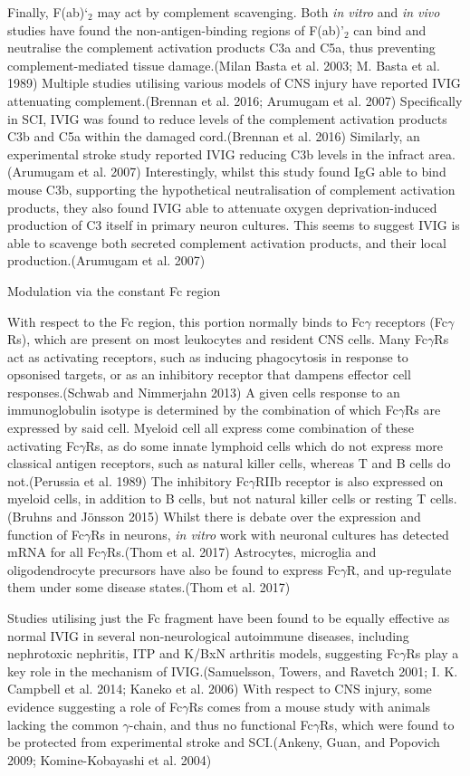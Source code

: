 \documentclass[9pt,lineno]{elife}
\begin{document}
\begin{landscape}
\begin{landscape}
Finally, F(ab)`\(_2\) may act by complement scavenging.
Both \emph{in vitro} and \emph{in vivo} studies have found the non-antigen-binding regions of F(ab)'\(_2\) can bind and neutralise the complement activation products C3a and C5a, thus preventing complement-mediated tissue damage.(Milan Basta et al. 2003; M. Basta et al. 1989) Multiple studies utilising various models of CNS injury have reported IVIG attenuating complement.(Brennan et al. 2016; Arumugam et al. 2007) Specifically in SCI, IVIG was found to reduce levels of the complement activation products C3b and C5a within the damaged cord.(Brennan et al. 2016) Similarly, an experimental stroke study reported IVIG reducing C3b levels in the infract area.(Arumugam et al. 2007) Interestingly, whilst this study found IgG able to bind mouse C3b, supporting the hypothetical neutralisation of complement activation products, they also found IVIG able to attenuate oxygen deprivation-induced production of C3 itself in primary neuron cultures.
This seems to suggest IVIG is able to scavenge both secreted complement activation products, and their local production.(Arumugam et al. 2007)

Modulation via the constant Fc region

With respect to the Fc region, this portion normally binds to Fc\(\gamma\) receptors (Fc\(\gamma\)Rs), which are present on most leukocytes and resident CNS cells.
Many Fc\(\gamma\)Rs act as activating receptors, such as inducing phagocytosis in response to opsonised targets, or as an inhibitory receptor that dampens effector cell responses.(Schwab and Nimmerjahn 2013) A given cells response to an immunoglobulin isotype is determined by the combination of which Fc\(\gamma\)Rs are expressed by said cell.
Myeloid cell all express come combination of these activating Fc\(\gamma\)Rs, as do some innate lymphoid cells which do not express more classical antigen receptors, such as natural killer cells, whereas T and B cells do not.(Perussia et al. 1989) The inhibitory Fc\(\gamma\)RIIb receptor is also expressed on myeloid cells, in addition to B cells, but not natural killer cells or resting T cells.(Bruhns and Jönsson 2015) Whilst there is debate over the expression and function of Fc\(\gamma\)Rs in neurons, \emph{in vitro} work with neuronal cultures has detected mRNA for all Fc\(\gamma\)Rs.(Thom et al. 2017) Astrocytes, microglia and oligodendrocyte precursors have also be found to express Fc\(\gamma\)R, and up-regulate them under some disease states.(Thom et al. 2017)

Studies utilising just the Fc fragment have been found to be equally effective as normal IVIG in several non-neurological autoimmune diseases, including nephrotoxic nephritis, ITP and K/BxN arthritis models, suggesting Fc\(\gamma\)Rs play a key role in the mechanism of IVIG.(Samuelsson, Towers, and Ravetch 2001; I. K. Campbell et al. 2014; Kaneko et al. 2006) With respect to CNS injury, some evidence suggesting a role of Fc\(\gamma\)Rs comes from a mouse study with animals lacking the common \(\gamma\)-chain, and thus no functional Fc\(\gamma\)Rs, which were found to be protected from experimental stroke and SCI.(Ankeny, Guan, and Popovich 2009; Komine-Kobayashi et al. 2004)


\end{landscape}
\end{landscape}
\end{document}
